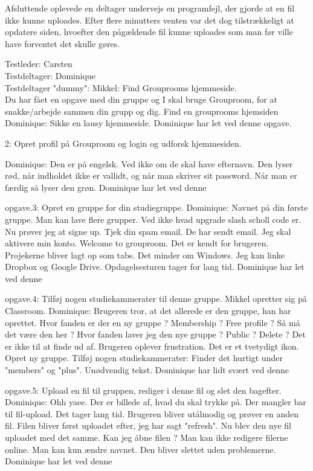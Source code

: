 \documentclass[12pt]{article}
\begin{document}
\noindent Afsluttende oplevede en deltager undervejs en programfejl, der gjorde at en fil ikke kunne uploades. Efter flere minutters venten var det dog tilstrækkeligt at opdatere siden, hvoefter den pågældende fil kunne uploades som man før ville have forventet det skulle gøres.

\newpage

Testleder: Carsten\\
Testdeltager: Dominique\\
Testdeltager "dummy": Mikkel: Find Grouprooms hjemmeside.\\

Du har f\aa et en opgave med din gruppe og I skal bruge Grouproom, for at snakke/arbejde sammen din grupp og dig. Find en grouprooms hjemsiden
Dominique: Sikke en lausy hjemmeside.
Dominique har let ved denne opgave.

2: Opret profil på Grouproom og login og udforsk hjemmesiden.

Dominique: Den er på engelsk. Ved ikke om de skal have efternavn. Den lyser rød, når indholdet ikke er vallidt, og når man skriver sit password. Når man er færdig så lyser den grøn.
Dominique har let ved denne 

opgave.3: Opret en gruppe for din studiegruppe.
Dominique: Navnet på din første gruppe. Man kan lave flere grupper. Ved ikke hvad upgrade slash scholl code er.
Nu prøver jeg at signe up.
Tjek din spam email. De har sendt email.
Jeg skal aktivere min konto.
Welcome to grouproom.
Det er kendt for brugeren. Projekerne bliver lagt op som tabs. Det minder om Windows.
Jeg kan linke Dropbox og Google Drive.
Opdagelsesturen tager for lang tid.
Dominique har let ved denne 

opgave.4: Tilføj nogen studiekammerater til denne gruppe.
Mikkel opretter sig på Classroom.
Dominique: Brugeren tror, at det allerede er den gruppe, han har oprettet.
Hvor fanden er der en ny gruppe ?
Membership ? Free profile ? Så må det være den her ?
Hvor fanden laver jeg den nye gruppe ? Public ? Delete ?
Det er ikke til at finde ud af. Brugeren oplever frustration.
Det er et tvetydigt ikon. Opret ny gruppe.
Tilføj nogen studiekammerater: Finder det hurtigt under "members" og "plus". Unødvendig tekst.
Dominique har lidt svært ved denne 

opgave.5: Upload en fil til gruppen, rediger i denne fil og slet den bagefter.
Dominique: Ohh yaee. Der er billede af, hvad du skal trykke på. Der mangler bar til fil-upload. Det tager lang tid. Brugeren bliver utålmodig og prøver en anden fil.
Filen bliver først uploadet efter, jeg har sagt "refresh".
Nu blev den nye fil uploadet med det samme.
Kan jeg åbne filen ? Man kan ikke redigere filerne online. Man kan kun ændre navnet.
Den bliver slettet uden problemerne.
Dominique har let ved denne 
\end{document}
